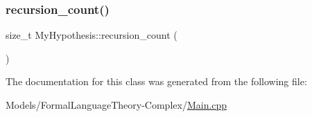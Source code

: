 \subsubsection{\texorpdfstring{recursion\+\_\+count()}{recursion\_count()}}
{\footnotesize\ttfamily size\+\_\+t My\+Hypothesis\+::recursion\+\_\+count (\begin{DoxyParamCaption}{ }\end{DoxyParamCaption})\hspace{0.3cm}{\ttfamily [inline]}}



The documentation for this class was generated from the following file\+:\begin{DoxyCompactItemize}
\item 
Models/\+Formal\+Language\+Theory-\/\+Complex/\hyperlink{_formal_language_theory-_complex_2_main_8cpp}{Main.\+cpp}\end{DoxyCompactItemize}
